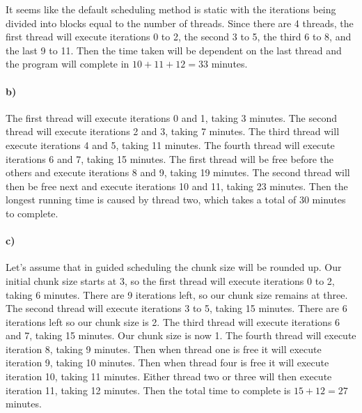 \documentclass[12pt]{article}
\begin{document}
It seems like the default scheduling method is static with the iterations being divided
into blocks equal to the number of threads. Since there are 4 threads, the first
thread will execute iterations 0 to 2, the second 3 to 5, the third 6 to 8, and the last
9 to 11. Then the time taken will be dependent on the last thread and the program will
complete in \(10+11+12=33\) minutes.

\paragraph{b)}

The first thread will execute iterations 0 and 1, taking 3 minutes. The second thread
will execute iterations 2 and 3, taking 7 minutes. The third thread will execute iterations
4 and 5, taking 11 minutes. The fourth thread will execute iterations 6 and 7, taking 15 minutes.
The first thread will be free before the others and execute iterations 8 and 9, taking 19 minutes.
The second thread will then be free next and execute iterations 10 and 11, taking 23 minutes. Then
the longest running time is caused by thread two, which takes a total of 30 minutes to complete.

\paragraph{c)}

Let's assume that in guided scheduling the chunk size will be rounded up.
Our initial chunk size starts at 3, so the first thread will execute iterations 0 to 2, taking
6 minutes. There are 9 iterations left, so our chunk size remains at three. The second thread will execute
iterations 3 to 5, taking 15 minutes. There are 6 iterations left so our chunk size is 2. The third thread
will execute iterations 6 and 7, taking 15 minutes. Our chunk size is now 1. The fourth thread will execute
iteration 8, taking 9 minutes. Then when thread one is free it will execute iteration 9, taking 10 minutes.
Then when thread four is free it will execute iteration 10, taking 11 minutes. Either thread two or three
will then execute iteration 11, taking 12 minutes. Then the total time to complete is \(15+12=27\) minutes.
\end{document}
